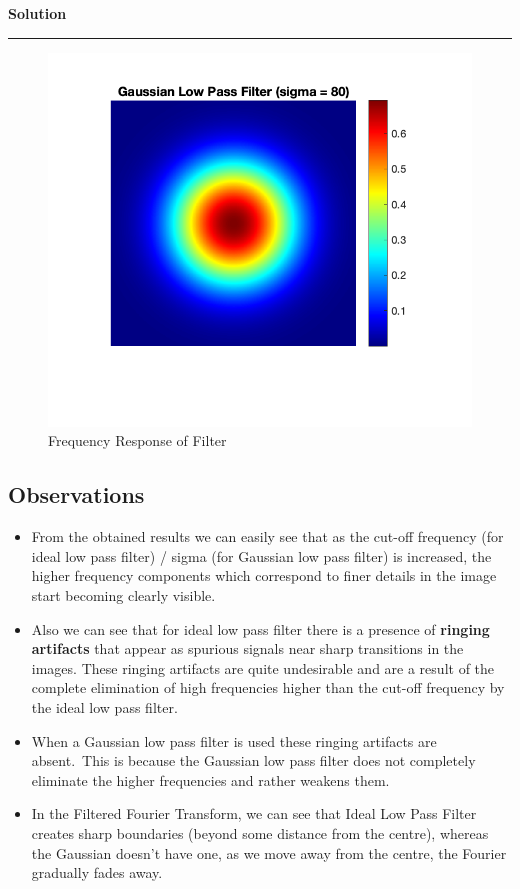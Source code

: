 \documentclass[a4paper]{article}
\newenvironment{solution}[2][]{%
    \begin{mdframed}[linecolor=green!60!black, linewidth=2pt, roundcorner=10pt, backgroundcolor=green!5!white, skipabove=12pt, skipbelow=12pt]%
        \textbf{\large #2} %
        \par\noindent\rule{\textwidth}{0.4pt} %
        \vspace{0.5em} %
}{%
    \end{mdframed}%
}
\begin{document}
\begin{solution}{Solution}
    \begin{figure}[H]
        \centering
        \includegraphics{../images/gaussian_LPF_80.png}
        \caption{Frequency Response of Filter}
    \end{figure}
    
    \subsection*{Observations}
    
    \begin{itemize}
        \item From the obtained results we can easily see that as the cut-oﬀ frequency (for ideal low pass
        ﬁlter) / sigma (for Gaussian low pass ﬁlter) is increased, the higher frequency components
        which correspond to ﬁner details in the image start becoming clearly visible.
        \item Also we can see that for ideal low pass ﬁlter there is a presence of \textbf{ringing artifacts} that appear
        as spurious signals near sharp transitions in the images. These ringing artifacts are quite
        undesirable and are a result of the complete elimination of high frequencies higher than the
        cut-oﬀ frequency by the ideal low pass ﬁlter.
        \item When a Gaussian low pass ﬁlter is used these ringing artifacts are absent.\ This is because the
        Gaussian low pass ﬁlter does not completely eliminate the higher frequencies and rather weakens
        them.
        \item In the Filtered Fourier Transform, we can see that Ideal Low Pass Filter creates sharp boundaries (beyond some distance from the centre), whereas the Gaussian doesn't have one, as we move away from the centre, the Fourier gradually fades away.
    \end{itemize}
\end{solution}
\end{document}
